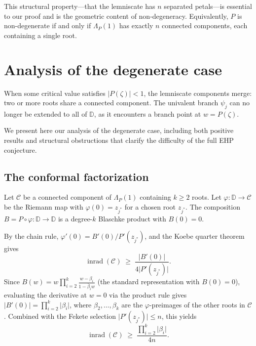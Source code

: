 \documentclass[11pt,a4paper]{amsart}
\theoremstyle{definition}
\newcommand{\D}{\mathbb{D}}
\newcommand{\abs}[1]{\lvert #1 \rvert}
\newcommand{\inrad}{\operatorname{inrad}}
\begin{document}
This structural property---that the lemniscate has $n$ separated petals---is
essential to our proof and is the geometric content of non-degeneracy.
Equivalently, $P$ is non-degenerate if and only if $\Lambda_P(1)$ has
exactly $n$ connected components, each containing a single root.

\section{Analysis of the degenerate case}
\label{sec:degenerate}

When some critical value satisfies $\abs{P(\zeta)} < 1$, the lemniscate
components merge: two or more roots share a connected component.
The univalent branch $\psi_j$ can no longer be extended to all of $\D$,
as it encounters a branch point at $w = P(\zeta)$.

We present here our analysis of the degenerate case, including both
positive results and structural obstructions that clarify the difficulty of
the full EHP conjecture.

\subsection{The conformal factorization}

Let $\mathcal{C}$ be a connected component of $\Lambda_P(1)$ containing
$k \geq 2$ roots.  Let $\varphi \colon \D \to \mathcal{C}$ be the
Riemann map with $\varphi(0) = z_{j^*}$ for a chosen root $z_{j^*}$.
The composition $B = P \circ \varphi \colon \D \to \D$ is a
degree-$k$ Blaschke product with $B(0) = 0$.

By the chain rule, $\varphi'(0) = B'(0)/P'(z_{j^*})$, and the
Koebe quarter theorem gives
\begin{equation}\label{eq:blaschke-inradius}
  \inrad(\mathcal{C}) \;\geq\; \frac{\abs{B'(0)}}{4\abs{P'(z_{j^*})}}.
\end{equation}
Since $B(w) = w \prod_{i=2}^k \frac{w - \beta_i}{1 - \bar\beta_i w}$
(the standard representation with $B(0) = 0$),
evaluating the derivative at $w = 0$ via the product rule gives
$\abs{B'(0)} = \prod_{i=2}^k \abs{\beta_i}$, where $\beta_2,
\ldots, \beta_k$ are the $\varphi$-preimages of the other roots in
$\mathcal{C}$.  Combined with the Fekete selection $\abs{P'(z_{j^*})} \leq n$,
this yields
\[
  \inrad(\mathcal{C}) \;\geq\;
  \frac{\prod_{i=2}^k \abs{\beta_i}}{4n}.
\]
\end{document}
